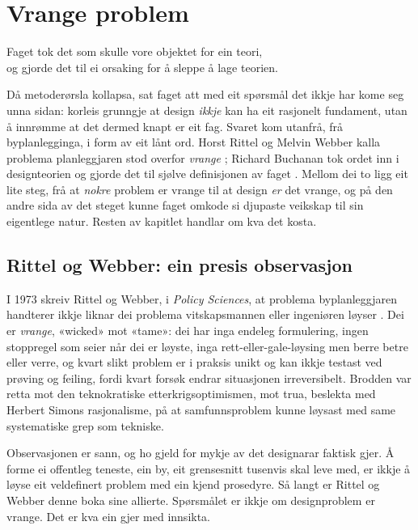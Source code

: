 \chapter{Vrange problem}

\begin{motto}
Faget tok det som skulle vore objektet for ein teori,\\ og gjorde det til ei orsaking for å sleppe å lage teorien.
\end{motto}

Då metoderørsla kollapsa, sat faget att med eit spørsmål det ikkje har kome seg unna sidan: korleis grunngje at design \emph{ikkje} kan ha eit rasjonelt fundament, utan å innrømme at det dermed knapt er eit fag. Svaret kom utanfrå, frå byplanlegginga, i form av eit lånt ord. Horst Rittel og Melvin Webber kalla problema planleggjaren stod overfor \emph{vrange} \autocite{rittel1973}; Richard Buchanan tok ordet inn i designteorien og gjorde det til sjølve definisjonen av faget \autocite{buchanan1992wicked}. Mellom dei to ligg eit lite steg, frå at \emph{nokre} problem er vrange til at design \emph{er} det vrange, og på den andre sida av det steget kunne faget omkode si djupaste veikskap til sin eigentlege natur. Resten av kapitlet handlar om kva det kosta.


\section{Rittel og Webber: ein presis observasjon}

I 1973 skreiv Rittel og Webber, i \emph{Policy Sciences}, at problema byplanleggjaren handterer ikkje liknar dei problema vitskapsmannen eller ingeniøren løyser \autocite{rittel1973}. Dei er \emph{vrange}, «wicked» mot «tame»: dei har inga endeleg formulering, ingen stoppregel som seier når dei er løyste, inga rett-eller-gale-løysing men berre betre eller verre, og kvart slikt problem er i praksis unikt og kan ikkje testast ved prøving og feiling, fordi kvart forsøk endrar situasjonen irreversibelt. Brodden var retta mot den teknokratiske etterkrigsoptimismen, mot trua, beslekta med Herbert Simons rasjonalisme, på at samfunnsproblem kunne løysast med same systematiske grep som tekniske.

Observasjonen er sann, og ho gjeld for mykje av det designarar faktisk gjer. Å forme ei offentleg teneste, ein by, eit grensesnitt tusenvis skal leve med, er ikkje å løyse eit veldefinert problem med ein kjend prosedyre. Så langt er Rittel og Webber denne boka sine allierte. Spørsmålet er ikkje om designproblem er vrange. Det er kva ein gjer med innsikta.

